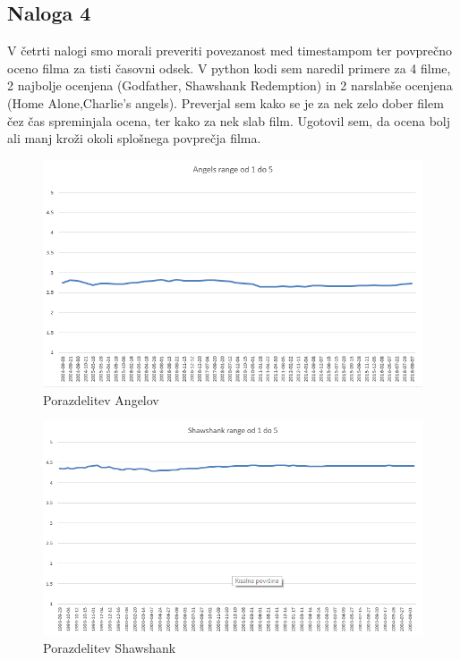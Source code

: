 \documentclass[a4paper,11pt]{article}
\begin{document}
\subsection{Naloga 4}
V četrti nalogi smo morali preveriti povezanost med timestampom ter povprečno oceno filma za tisti časovni odsek. V python kodi sem naredil primere za 4 filme, 2 najbolje ocenjena (Godfather, Shawshank Redemption) in 2 narslabše ocenjena (Home Alone,Charlie's angels). Preverjal sem kako se je za nek zelo dober filem čez čas spreminjala ocena, ter kako za nek slab film. Ugotovil sem, da ocena bolj ali manj kroži okoli splošnega povprečja filma.

\begin{figure}[htbp]
		\begin{center}
		\includegraphics[scale=0.8]{../slike/agnels_range.png}
		\caption{Porazdelitev Angelov}
		\label{angeli_range}
		\end{center}
\end{figure}


\begin{figure}[htbp]
	\begin{center}
		\includegraphics[scale=0.8]{../slike/shawshank_range.png}
		\caption{Porazdelitev Shawshank}
		\label{shawk_range}
	\end{center}
\end{figure}
\end{document}
